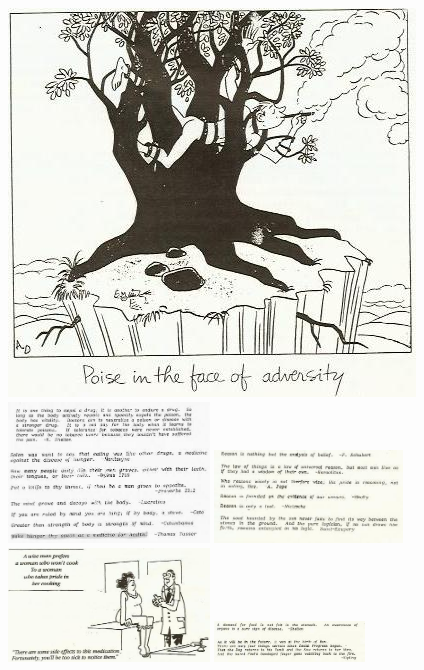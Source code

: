 \documentclass[landscape,twocolumn,letterpaper]{article}
\begin{document}
\clearpage%
\includegraphics[height=0.4\textheight,bb= 0 0 408 389]{./p21.jpg}
\clearpage%
\includegraphics[width=0.4\textwidth,bb= 0 0 449 315]{./p22quotes.jpg}
\clearpage%
\includegraphics[width=0.375\textwidth,bb=0 0 414 203]{./p23quotes.jpg}
\clearpage%
\includegraphics[width=0.4\textwidth,bb= 0 0 476 269]{./p24.jpg}
\clearpage%
\includegraphics[width=0.3\textwidth,bb= 0 0 422 113]{./p26quotes.jpg}
\end{document}
